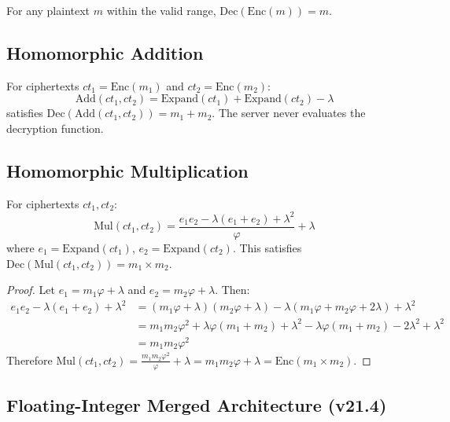 \documentclass[11pt,a4paper]{article}
\begin{document}
\begin{theorem}[Correctness]
For any plaintext $m$ within the valid range, $\text{Dec}(\text{Enc}(m)) = m$.
\end{theorem}

\subsection{Homomorphic Addition}

\begin{theorem}
For ciphertexts $ct_1 = \text{Enc}(m_1)$ and $ct_2 = \text{Enc}(m_2)$:
\[
\text{Add}(ct_1, ct_2) = \text{Expand}(ct_1) + \text{Expand}(ct_2) - \lambda
\]
satisfies $\text{Dec}(\text{Add}(ct_1, ct_2)) = m_1 + m_2$. The server never evaluates the decryption function.
\end{theorem}

\subsection{Homomorphic Multiplication}

\begin{theorem}
For ciphertexts $ct_1, ct_2$:
\[
\text{Mul}(ct_1, ct_2) = \frac{e_1 e_2 - \lambda(e_1 + e_2) + \lambda^2}{\varphi} + \lambda
\]
where $e_1 = \text{Expand}(ct_1)$, $e_2 = \text{Expand}(ct_2)$. This satisfies $\text{Dec}(\text{Mul}(ct_1, ct_2)) = m_1 \times m_2$.
\end{theorem}

\begin{proof}
Let $e_1 = m_1\varphi + \lambda$ and $e_2 = m_2\varphi + \lambda$. Then:
\begin{align*}
e_1 e_2 - \lambda(e_1 + e_2) + \lambda^2 &= (m_1\varphi + \lambda)(m_2\varphi + \lambda) - \lambda(m_1\varphi + m_2\varphi + 2\lambda) + \lambda^2 \\
&= m_1 m_2 \varphi^2 + \lambda\varphi(m_1 + m_2) + \lambda^2 - \lambda\varphi(m_1 + m_2) - 2\lambda^2 + \lambda^2 \\
&= m_1 m_2 \varphi^2
\end{align*}
Therefore $\text{Mul}(ct_1, ct_2) = \frac{m_1 m_2 \varphi^2}{\varphi} + \lambda = m_1 m_2 \varphi + \lambda = \text{Enc}(m_1 \times m_2)$.
\end{proof}

\subsection{Floating-Integer Merged Architecture (v21.4)}
\end{document}
